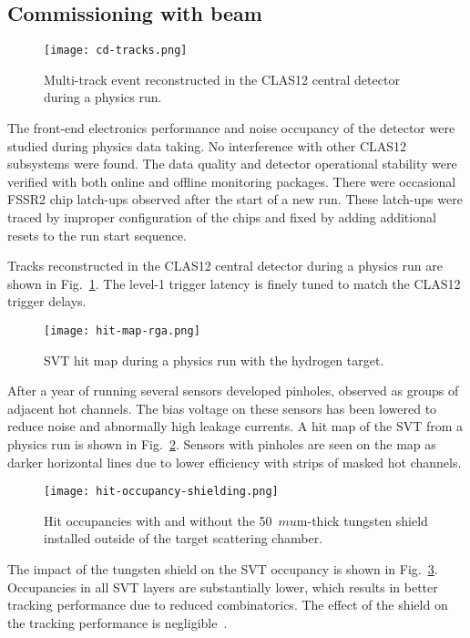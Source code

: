 \subsection{Commissioning with beam}

\begin{figure}[hbt] 
\centering 
\texttt{[image: cd-tracks.png]}
\caption{Multi-track event reconstructed in the CLAS12 central detector during a physics run.}
\label{fig:cd-tracks}
\end{figure}

The front-end electronics performance and noise occupancy of the detector were studied during physics data taking. No interference with other CLAS12 subsystems were found. The data quality and detector operational stability  were verified with both online and offline monitoring packages. There were occasional FSSR2 chip latch-ups observed after the start of a new run. These latch-ups were traced by improper configuration of the chips and fixed by adding additional resets to the run start sequence.

Tracks reconstructed in the CLAS12 central detector during a physics run are shown in Fig.~\ref{fig:cd-tracks}. The level-1 trigger latency is finely tuned to match the CLAS12 trigger delays.

\begin{figure}[hbt] 
\centering 
\texttt{[image: hit-map-rga.png]}
\caption{SVT hit map during a physics run with the hydrogen target.}
\label{fig:hit-map-rga}
\end{figure}

After a year of running several sensors developed pinholes, observed as groups of adjacent hot channels. The bias voltage on these sensors has been lowered to reduce noise and abnormally high leakage currents. A hit map of the SVT from a physics run is shown in Fig.~\ref{fig:hit-map-rga}. Sensors with pinholes are seen on the map as darker horizontal lines due to lower efficiency with strips of masked hot channels. 

\begin{figure}[hbt] 
\centering 
\texttt{[image: hit-occupancy-shielding.png]}
\caption{Hit occupancies with and without the 50~$mu$m-thick tungsten shield installed outside of the target scattering chamber.}
\label{fig:hit-occupancy-shielding}
\end{figure}

The impact of the tungsten shield on the SVT occupancy is shown in Fig.~\ref{fig:hit-occupancy-shielding}. Occupancies in all SVT layers are substantially lower, which results in better tracking performance due to reduced combinatorics. The effect of the shield on the tracking performance is negligible~\cite{SHIELDNOTE}.


